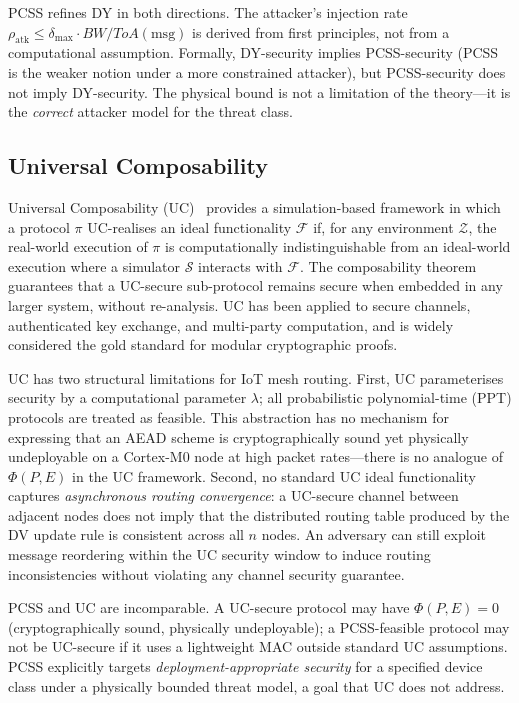 \documentclass[journal,compsoc]{IEEEtran}
\theoremstyle{plain}
\theoremstyle{definition}
\theoremstyle{remark}
\begin{document}
PCSS refines DY in both directions.  The attacker's injection rate
$\rho_\text{atk} \leq \delta_{\max} \cdot \mathit{BW} /
\mathit{ToA}(\text{msg})$ is derived from first principles, not from a
computational assumption.  Formally, DY-security implies PCSS-security
(PCSS is the weaker notion under a more constrained attacker), but
PCSS-security does not imply DY-security.  The physical bound is not a
limitation of the theory---it is the \emph{correct} attacker model for the
threat class.

\subsection{Universal Composability}

Universal Composability (UC)~\cite{canetti2001universally} provides a
simulation-based framework in which a protocol $\pi$ UC-realises an ideal
functionality $\mathcal{F}$ if, for any environment $\mathcal{Z}$, the
real-world execution of $\pi$ is computationally indistinguishable from an
ideal-world execution where a simulator $\mathcal{S}$ interacts with
$\mathcal{F}$.  The composability theorem guarantees that a UC-secure
sub-protocol remains secure when embedded in any larger system, without
re-analysis.  UC has been applied to secure channels, authenticated key
exchange, and multi-party computation, and is widely considered the gold
standard for modular cryptographic proofs.

UC has two structural limitations for IoT mesh routing.  First, UC
parameterises security by a computational parameter $\lambda$; all
probabilistic polynomial-time (PPT) protocols are treated as feasible.
This abstraction has no mechanism for expressing that an AEAD scheme is
cryptographically sound yet physically undeployable on a Cortex-M0 node at
high packet rates---there is no analogue of $\Phi(P,E)$ in the UC
framework.  Second, no standard UC ideal functionality captures
\emph{asynchronous routing convergence}: a UC-secure channel between
adjacent nodes does not imply that the distributed routing table produced by
the DV update rule is consistent across all $n$ nodes.  An adversary can
still exploit message reordering within the UC security window to induce
routing inconsistencies without violating any channel security guarantee.

PCSS and UC are incomparable.  A UC-secure protocol may have $\Phi(P,E) =
0$ (cryptographically sound, physically undeployable); a PCSS-feasible
protocol may not be UC-secure if it uses a lightweight MAC outside standard
UC assumptions.  PCSS explicitly targets \emph{deployment-appropriate
security} for a specified device class under a physically bounded threat
model, a goal that UC does not address.
\end{document}
